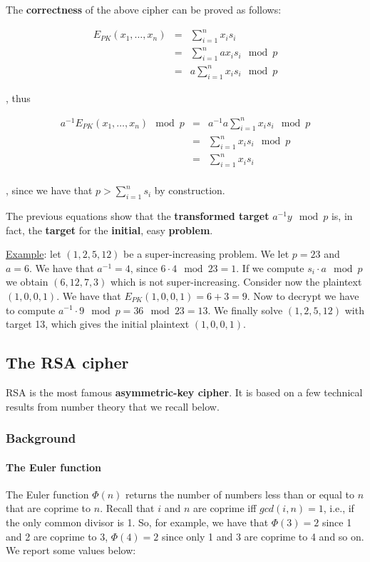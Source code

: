The \textbf{correctness} of the above cipher can be proved as follows:

$$\begin{array}{rcl}E_{PK}(x_1, \ldots, x_n) &=& \sum_{i=1}^{n}{x_i \hat{s_i}}\\ & = & \sum_{i=1}^{n}{a x_i  s_i \mod p}\\& = & a\sum_{i=1}^{n}{x_i  s_i \mod p}\end{array}$$


, thus

$$\begin{array}{rcl}a^{-1}E_{PK}(x_1, \ldots, x_n) \mod p &=& a^{-1} a\sum_{i=1}^{n}{x_i  s_i \mod p}\\ &=& \sum_{i=1}^{n}{x_i  s_i \mod p}\\ &=& \sum_{i=1}^{n}{x_i  s_i}\\\end{array}$$

, since we have that $p > \sum_{i = 1}^n s_i$ by construction. 

The previous equations show that the \textbf{transformed target} $a^{-1} y \mod p$ is, in fact, the \textbf{target} for the \textbf{initial}, easy \textbf{problem}.

\underline{Example}: let $(1,2,5,12)$ be a super-increasing problem. We let $p=23$ and $a=6$. We have that $a^{-1} = 4$, since $6 \cdot 4 \mod 23 = 1$. If we compute $s_i \cdot a \mod p$ we obtain $(6,12,7,3)$ which is not super-increasing. Consider now the plaintext $(1,0,0,1)$. We have that $E_{PK}(1,0,0,1) = 6 + 3 = 9$. Now to decrypt we have to compute $a^{-1} \cdot 9 \mod p = 36 \mod 23 = 13$. We finally solve $(1,2,5,12)$ with target 13, which gives the initial plaintext $(1,0,0,1)$.

\subsection{The RSA cipher}
RSA is the most famous \textbf{asymmetric-key cipher}. It is based on a few technical results from number theory that we recall below.

\subsubsection{Background}

\paragraph{The Euler function} The Euler function $\Phi(n)$ returns the number of numbers less than or equal to $n$ that are coprime to $n$. Recall that $i$ and $n$ are coprime iff $gcd(i,n) = 1$, i.e., if the only common divisor is 1. So, for example, we have that $\Phi(3) = 2$ since 1 and 2 are coprime to 3, $\Phi(4) = 2$ since only 1 and 3 are coprime to 4 and so on. We report some values below:

